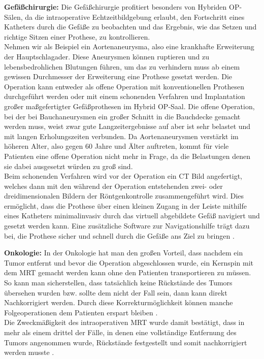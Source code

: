 \textbf{Gefäßchirurgie:}
Die Gefäßchirurgie profitiert besonders von Hybriden OP-Sälen, da die intraoperative Echtzeitbildgebung erlaubt, den Fortschritt eines Katheters durch die Gefäße zu beobachten und das Ergebnis, wie das Setzen und richtige Sitzen einer Prothese, zu kontrollieren.\\
Nehmen wir als Beispiel ein Aortenaneurysma, also eine krankhafte Erweiterung der Hauptschlagader. Diese Aneurysmen können ruptieren und zu lebensbedrohlichen Blutungen führen, um das zu verhindern muss ab einem gewissen Durchmesser der Erweiterung eine Prothese gesetzt werden. Die Operation kann entweder als offene Operation mit konventionellen Prothesen durchgeführt werden oder mit einem schonenden Verfahren und Implantation großer maßgefertigter Gefäßprothesen im Hybrid OP-Saal. Die offene Operation, bei der bei Bauchaneurysmen ein großer Schnitt in die Bauchdecke gemacht werden muss, weist zwar gute Langzeitergebnisse auf aber ist sehr belastet und mit langen Erholungszeiten verbunden. Da Aortenaneurysmen verstärkt im höheren Alter, also gegen 60 Jahre und Älter auftreten, kommt für viele Patienten eine offene Operation nicht mehr in Frage, da die Belastungen denen sie dabei ausgesetzt würden zu groß sind. \\
Beim schonenden Verfahren wird vor der Operation ein CT Bild angefertigt, welches dann mit den während der Operation entstehenden zwei- oder dreidimensionalen Bildern der Röntgenkontrolle zusammengeführt wird. Dies ermöglicht, dass die Prothese über einen kleinen Zugang in der Leiste mithilfe eines Katheters minimalinvasiv durch das virtuell abgebildete Gefäß navigiert und gesetzt werden kann. Eine zusätzliche Software zur Navigationshilfe trägt dazu bei, die Prothese sicher und schnell durch die Gefäße ans Ziel zu bringen \cite{Aortenaneurysma,DresdnerUniklinikum,TickendeBombeImBauch}.

\textbf{Onkologie:}
In der Onkologie hat man den großen Vorteil, dass nachdem ein Tumor entfernt und bevor die Operation abgeschlossen wurde, ein Kernspin mit dem MRT gemacht werden kann ohne den Patienten transportieren zu müssen. So kann man sicherstellen, dass tatsächlich keine Rückstände des Tumors übersehen wurden bzw. sollte dem nicht der Fall sein, dann kann direkt Nachkorrigiert werden. Durch diese Korrekturmöglichkeit können manche Folgeoperationen dem Patienten erspart bleiben \cite{AerzteZeitung}.\\
Die Zweckmäßigkeit des intraoperativen MRT wurde damit bestätigt, dass in mehr als einem drittel der Fälle, in denen eine vollständige Entfernung des Tumors angenommen wurde, Rückstände festgestellt und somit nachkorrigiert werden musste \cite{BrainShiftInTumorResection}.

